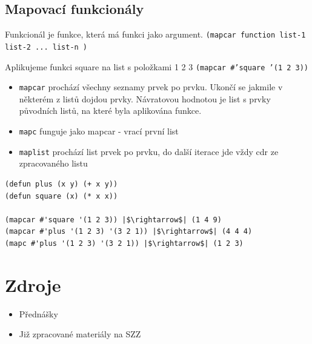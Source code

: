 \documentclass{szzclass}
\begin{document}
\subsection{Mapovací funkcionály}
Funkcionál je funkce, která má funkci jako argument.
  \texttt{(mapcar function list-1 list-2 ... list-n )}

Aplikujeme funkci square na list s položkami 1 2 3
  \texttt{(mapcar #'square '(1 2 3))}

\begin{itemize}
\item \texttt{mapcar} prochází všechny seznamy prvek po prvku. Ukončí se jakmile v některém z listů dojdou prvky. Návratovou hodnotou je list s prvky původních listů, na které byla aplikována funkce.
\item \texttt{mapc} funguje jako mapcar - vrací první list
\item \texttt{maplist} prochází list prvek po prvku, do další iterace jde vždy cdr ze zpracovaného listu
\end{itemize}

\begin{verbatim}
(defun plus (x y) (+ x y))
(defun square (x) (* x x))

(mapcar #'square '(1 2 3)) |$\rightarrow$| (1 4 9)
(mapcar #'plus '(1 2 3) '(3 2 1)) |$\rightarrow$| (4 4 4)
(mapc #'plus '(1 2 3) '(3 2 1)) |$\rightarrow$| (1 2 3)
\end{verbatim}

\section{Zdroje}
\begin{itemize}
\item Přednášky
\item Již zpracované materiály na SZZ
\end{itemize}
\end{document}
